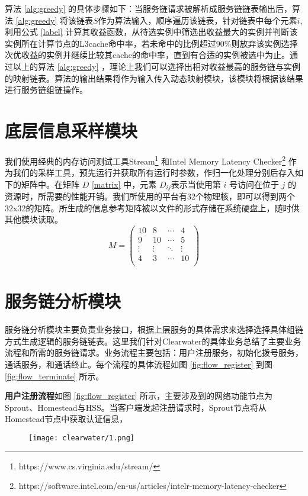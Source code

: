 算法 \ref{alg:greedy} 的具体步骤如下：当服务链请求被解析成服务链链表输出后，算法 \ref{alg:greedy} 将该链表$S$作为算法输入，顺序遍历该链表，针对链表中每个元素$i$,利用公式 \ref{label} 计算其收益函数，从待选实例中筛选出收益最大的实例并判断该实例所在计算节点的L3cache命中率，若未命中的比例超过90\%则放弃该实例选择次优收益的实例并继续比较其cache的命中率，直到有合适的实例被选中为止。通过以上的算法 \ref{alg:greedy} ，理论上我们可以选择出相对收益最高的服务链与实例的映射链表。算法的输出结果将作为输入传入动态映射模块，该模块将根据该结果进行服务链组链操作。


\section{底层信息采样模块}
我们使用经典的内存访问测试工具Stream\footnote{https://www.cs.virginia.edu/stream/} 和Intel Memory Latency Checker\footnote{https://software.intel.com/en-us/articles/intelr-memory-latency-checker} 作为我们的采样工具，预先运行并获取所有运行时参数，作归一化处理分别后存入如下的矩阵中。在矩阵 $D$ \ref{matrix} 中，元素 $D_{ij}$表示当使用第 $i$ 号访问在位于 $j$ 的资源时，所需要的性能开销。我们所使用的平台有32个物理核，即可以得到两个32x32的矩阵。所生成的信息参考矩阵被以文件的形式存储在系统硬盘上，随时供其他模块读取。
$$
M =
\begin{pmatrix}
\label{matrix}
10      & 8      & \cdots & 4      \\
9      & 10      & \cdots & 5      \\
\vdots & \vdots & \ddots & \vdots \\
4      & 3      & \cdots & 10     \\
\end{pmatrix}
$$


\section{服务链分析模块}
服务链分析模块主要负责业务接口，根据上层服务的具体需求来选择选择具体组链方式生成逻辑的服务链链表。这里我们针对Clearwater的具体业务总结了主要业务流程和所需的服务链请求。业务流程主要包括：用户注册服务，初始化拨号服务，通话服务，和通话终止。每个流程的具体流程如图 \ref{fig:flow_register} 到图 \ref{fig:flow_terminate} 所示。

\textbf{用户注册流程}如图 \ref{fig:flow_register} 所示，主要涉及到的网络功能节点为Sprout、Homestead与HSS。当客户端发起注册请求时，Sprout节点将从Homestead节点中获取认证信息，
\begin{figure}[!htp]
	\centering
	\texttt{[image: clearwater/1.png]}
\end{figure}

